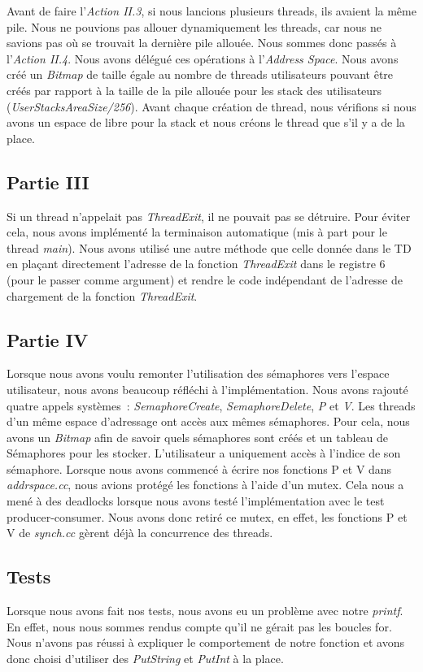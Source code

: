 \documentclass{article}
\begin{document}
Avant de faire l'\textit{Action II.3}, si nous lancions plusieurs threads, ils avaient la même pile.
Nous ne pouvions pas allouer dynamiquement les threads, car nous ne savions pas où se trouvait
la dernière pile allouée. Nous sommes donc passés à l'\textit{Action II.4}. Nous avons délégué
ces opérations à l'\textit{Address Space}. Nous avons créé un \textit{Bitmap} de taille égale au 
nombre de threads utilisateurs pouvant être créés par rapport à la taille de la pile allouée pour 
les stack des utilisateurs (\textit{UserStacksAreaSize/256}). Avant chaque création
de thread, nous vérifions si nous avons un espace de libre pour la stack et nous créons le thread que s'il y a de la place.

\subsection{Partie III}
Si un thread n'appelait pas \textit{ThreadExit}, il ne pouvait pas se détruire. Pour éviter cela, nous avons implémenté la terminaison 
automatique (mis à part pour le thread \textit{main}). Nous avons utilisé une autre méthode que celle donnée dans le TD en plaçant 
directement l'adresse de la fonction \textit{ThreadExit} dans le registre 6 (pour le passer comme argument) et rendre le code indépendant
de l'adresse de chargement de la fonction \textit{ThreadExit}.


\subsection{Partie IV}
Lorsque nous avons voulu remonter l'utilisation des sémaphores vers l'espace
utilisateur, nous avons beaucoup réfléchi à l'implémentation. Nous avons
rajouté quatre appels systèmes : \textit{SemaphoreCreate},
\textit{SemaphoreDelete}, \textit{P} et \textit{V}. Les threads
d'un même espace d'adressage ont accès aux mêmes sémaphores. Pour cela, nous
avons un \textit{Bitmap} afin de savoir quels sémaphores sont créés et un
tableau de Sémaphores pour les stocker. L'utilisateur a uniquement accès à
l'indice de son sémaphore. Lorsque nous avons commencé à écrire nos fonctions P
et V dans \textit{addrspace.cc}, nous avions protégé les fonctions à l'aide
d'un mutex. Cela nous a mené à des deadlocks lorsque nous avons testé
l'implémentation avec le test producer-consumer. Nous avons donc retiré ce
mutex, en effet, les fonctions P et V de \textit{synch.cc} gèrent déjà la
concurrence des threads.

\subsection{Tests}
Lorsque nous avons fait nos tests, nous avons eu un problème avec notre
\textit{printf}. En effet, nous nous sommes rendus compte qu'il ne gérait pas
les boucles for. Nous n'avons pas réussi à expliquer le comportement de notre
fonction et avons donc choisi d'utiliser des \textit{PutString} et
\textit{PutInt} à la place.
\end{document}

